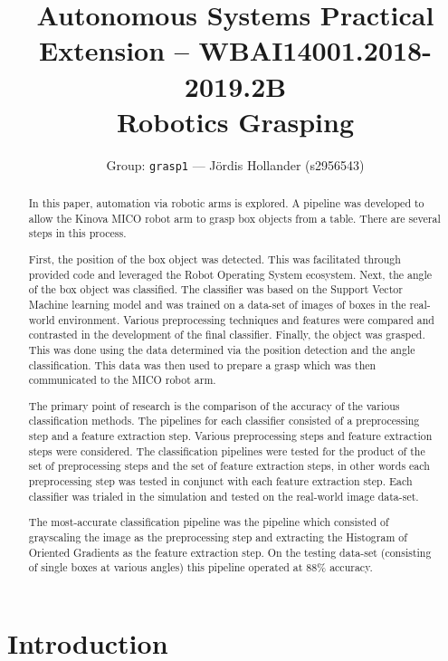 \documentclass[letterpaper, 10 pt, conference]{conf/ieeeconf}  %
\title{\LARGE \bf
  Autonomous Systems Practical Extension -- WBAI14001.2018-2019.2B \\
  Robotics Grasping
}
\author{Group: \texttt{grasp1} --- J\"{o}rdis Hollander (s2956543)}
\begin{document}
\maketitle
\thispagestyle{empty}
\pagestyle{empty}


\begin{abstract}
  In this paper, automation via robotic arms is explored. A pipeline was developed
  to allow the Kinova MICO robot arm to grasp box objects from a table. There
  are several steps in this process.

  First, the position of the box object was detected. This was facilitated
  through provided code and leveraged the Robot Operating System ecosystem.
  Next, the angle of the box object was classified. The classifier was based on
  the Support Vector Machine learning model and was trained on a data-set of
  images of boxes in the real-world environment. Various preprocessing techniques
  and features were compared and contrasted in the development of the final
  classifier.
  Finally, the object was grasped. This was done using the data determined via
  the position detection and the angle classification. This data was then used to
  prepare a grasp which was then communicated to the MICO robot arm.

  The primary point of research is the comparison of the accuracy of the various
  classification methods. The pipelines for each classifier consisted of a
  preprocessing step and a feature extraction step.
  Various preprocessing steps and feature extraction steps were considered. The
  classification pipelines were tested for the product of the set of preprocessing
  steps and the set of feature extraction steps, in other words each preprocessing
  step was tested in conjunct with each feature extraction step. Each classifier
  was trialed in the simulation and tested on the real-world image data-set.

  The most-accurate classification pipeline was the pipeline which consisted of
  grayscaling the image as the preprocessing step and extracting the Histogram of
  Oriented Gradients as the feature extraction step. On the testing data-set
  (consisting of single boxes at various angles) this pipeline operated at 88\%
  accuracy.
\end{abstract}



\section{Introduction}
\end{document}

